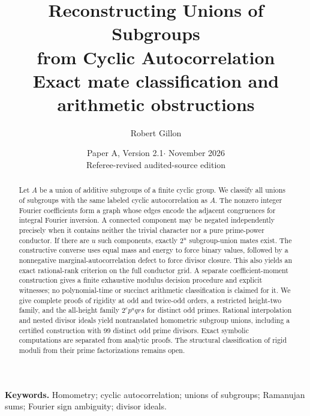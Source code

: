 \documentclass[11pt]{article}
\title{Reconstructing Unions of Subgroups\protect\\from Cyclic Autocorrelation\protect\\[.35em]\large Exact mate classification and arithmetic obstructions}
\author{Robert Gillon}
\date{Paper A, Version 2.1\enspace $\cdot$\enspace 22 November 2026\protect\\\small Referee-revised audited-source edition}
\numberwithin{equation}{section}
\theoremstyle{definition}
\theoremstyle{remark}
\begin{document}
\maketitle
\begin{abstract}
Let $A$ be a union of additive subgroups of a finite cyclic group. We classify all unions of subgroups with the same labeled cyclic autocorrelation as $A$. The nonzero integer Fourier coefficients form a graph whose edges encode the adjacent congruences for integral Fourier inversion. A connected component may be negated independently precisely when it contains neither the trivial character nor a pure prime-power conductor. If there are $u$ such components, exactly $2^u$ subgroup-union mates exist. The constructive converse uses equal mass and energy to force binary values, followed by a nonnegative marginal-autocorrelation defect to force divisor closure. This also yields an exact rational-rank criterion on the full conductor grid. A separate coefficient-moment construction gives a finite exhaustive modulus decision procedure and explicit witnesses; no polynomial-time or succinct arithmetic classification is claimed for it. We give complete proofs of rigidity at odd and twice-odd orders, a restricted height-two family, and the all-height family $2^e p^a qrs$ for distinct odd primes. Rational interpolation and nested divisor ideals yield nontranslated homometric subgroup unions, including a certified construction with 99 distinct odd prime divisors. Exact symbolic computations are separated from analytic proofs. The structural classification of rigid moduli from their prime factorizations remains open.
\end{abstract}
\vspace{.5em}
\noindent\textbf{Keywords.} Homometry; cyclic autocorrelation; unions of subgroups; Ramanujan sums; Fourier sign ambiguity; divisor ideals.
\clearpage
\setcounter{tocdepth}{1}
\tableofcontents
\clearpage











\appendix



\end{document}

